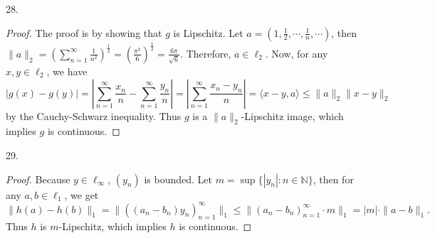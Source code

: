 \documentclass[12pt, a4paper]{article}
\theoremstyle{plain}
\newcommand{\N}{\mathbb{N}}
\begin{document}
28.
\begin{proof}
The proof is by showing that $g$ is Lipschitz. Let $a=(1,\frac{1}{2},\cdots,\frac{1}{n},\cdots)$, then $\|a\|_2=(\sum_{n=1}^{\infty}{\frac{1}{n^2}})^\frac{1}{2}=(\frac{\pi^2}{6})^\frac{1}{2}=\frac{6\pi}{\sqrt{6}}$. Therefore, $a\in \ell_2$. Now, for any $x,y\in \ell_2$, we have
\[
|g(x)-g(y)|=\left|\sum_{n=1}^{\infty}{\frac{x_n}{n}}-\sum_{n=1}^{\infty}{\frac{y_n}{n}}\right|=\left|\sum_{n=1}^{\infty}{\frac{x_n-y_n}{n}}\right|=\langle{x-y,a}\rangle\leq \|a\|_2\|x-y\|_2
\]
by the Cauchy-Schwarz inequality. Thus $g$ is a $\|a\|_2$-Lipschitz image, which implies $g$ is continuous.
\end{proof}

29.
\begin{proof}
Because $y\in\ell_\infty$, $(y_n)$ is bounded. Let $m=\sup\{|y_n|:n\in\N\}$, then for any $a,b\in \ell_1$, we get
\[
\|h(a)-h(b)\|_1=\|((a_n-b_n)y_n)_{n=1}^\infty\|_1\leq \|(a_n-b_n)_{n=1}^\infty\cdot m\|_1=|m|\cdot \|a-b\|_1.
\]
Thus $h$ is $m$-Lipschitz, which implies $h$ is continuous.
\end{proof}
\end{document}
